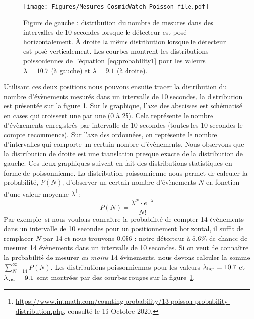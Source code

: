 \documentclass[a4paper, 12pt]{article}
\begin{document}
\begin{spacing}{1.5}
\begin{figure}[t]
\begin{center}
\texttt{[image: Figures/Mesures-CosmicWatch-Poisson-file.pdf]}
\caption{\label{fig:distribution10s} Figure de gauche : distribution du nombre de mesures dans des intervalles de 10 secondes lorsque le détecteur est posé horizontalement. À droite la même distribution lorsque le détecteur est posé verticalement. Les courbes montrent les distributions poissoniennes de l'équation~\ref{eq:probability1} pour les valeurs $\lambda=10.7$ (à gauche) et $\lambda=9.1$ (à droite).}
\end{center}
\end{figure}
Utilisant ces deux positions nous pouvons ensuite tracer la distribution du nombre d'évènements mesurés dans un intervalle de 10 secondes, la distribution est présentée sur la figure \ref{fig:distribution10s}.
Sur le graphique, l’axe des abscisses est schématisé en cases qui croissent une par une (0 à 25). Cela représente le nombre d'évènements enregistrés par intervalle de 10 secondes (toutes les 10 secondes le compte recommence). Sur l’axe des ordonnées, on représente le nombre d'intervalles qui comporte un certain nombre d'évènements.  
Nous observons que la distribution de droite est une translation presque exacte de la distribution de gauche. Ces deux graphiques suivent en fait des distributions statistiques en forme de poissonnienne. La distribution poissonnienne nous permet de calculer la probabilité, $P(N)$, d'observer un certain nombre d'évènements $N$ en fonction d'une valeur moyenne $\lambda$\footnote{\url{https://www.intmath.com/counting-probability/13-poisson-probability-distribution.php}, consulté le 16 Octobre 2020.}:
\begin{equation}
P(N)  = \frac{\lambda^N\cdot e^{-\lambda}}{N!} \label{eq:probability1}
\end{equation}
Par exemple, si nous voulons connaître la probabilité de compter 14 évènements dans un intervalle de 10 secondes pour un positionnement horizontal, il suffit de remplacer $N$ par 14 et nous trouvons 0.056 : notre détecteur à $5.6 \%$ de chance de mesurer 14 évènements dans un intervalle de 10 secondes. Si on veut de connaître la probabilité de mesurer {\em au moins} 14 évènements, nous devons calculer la somme $\sum_{N=14}^{\infty}P(N)$. Les distributions poissonniennes pour les valeurs $\lambda_{\rm hor}=10.7$ et  $\lambda_{\rm ver}=9.1$  sont montrées par des courbes rouges sur la figure~\ref{fig:distribution10s}. 


\end{spacing}
\end{document}

